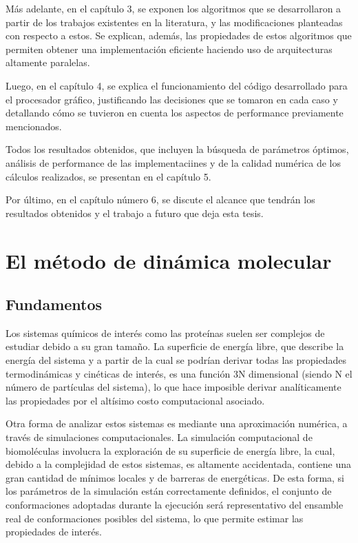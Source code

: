 Más adelante, en el capítulo 3, se exponen los algoritmos que se desarrollaron a partir de los trabajos existentes en la literatura, y las modificaciones planteadas con respecto a estos. 
Se explican, adem\'as, las propiedades de estos algoritmos que permiten obtener una implementación eficiente haciendo uso de arquitecturas altamente paralelas.

Luego, en el capítulo 4, se explica el funcionamiento del código desarrollado para el procesador gráfico, justificando las decisiones que se tomaron en cada caso y detallando 
cómo se tuvieron en cuenta los aspectos de performance previamente mencionados. 

Todos los resultados obtenidos, que incluyen la búsqueda de parámetros óptimos, análisis de performance de las implementaciines y de la calidad numérica de los cálculos realizados, se presentan en el capítulo 5.

Por último, en el capítulo número 6, se discute el alcance que tendrán los resultados obtenidos y el trabajo a futuro que deja esta tesis.


\section{El método de dinámica molecular}

\subsection{Fundamentos}


Los sistemas químicos de interés como las proteínas suelen ser complejos de estudiar debido a su gran tamaño. 
La superficie de energía libre, que describe la energía del sistema y a partir de la cual se podrían derivar todas 
las propiedades termodinámicas y cinéticas de interés, es una función 3N dimensional (siendo N el número de partículas del sistema), 
lo que hace imposible derivar analíticamente las propiedades por el altísimo costo computacional asociado.

Otra forma de analizar estos sistemas es mediante una aproximación numérica, a través de simulaciones computacionales.
La simulación computacional de biomoléculas involucra la exploración de su superficie de energía libre, la cual, debido a la complejidad de estos sistemas, es altamente accidentada, 
contiene una gran cantidad de mínimos locales y de barreras de energéticas. 
De esta forma, si los parámetros de la simulación están correctamente definidos, el conjunto de conformaciones adoptadas durante la ejecución será representativo del ensamble 
real de conformaciones posibles del sistema, lo que permite estimar las propiedades de interés.


